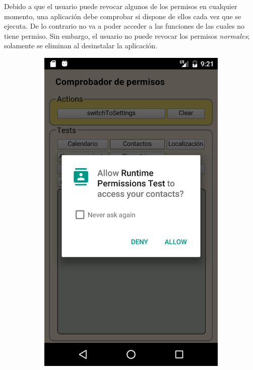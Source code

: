 Debido a que el usuario puede revocar algunos de los permisos en cualquier momento, una aplicación debe comprobar si dispone de ellos cada vez que se ejecuta. De lo contrario no va a poder acceder a las funciones de las cuales no tiene permiso. Sin embargo, el usuario no puede revocar los permisos \emph{normales}; solamente se eliminan al desinstalar la aplicación.
\begin{figure}[btp]
    \centering
    \begin{subfigure}{0.35\linewidth}
        \includegraphics[width=\linewidth]{imgs/chapter5/allow_contact}

\end{subfigure}
\end{figure}
